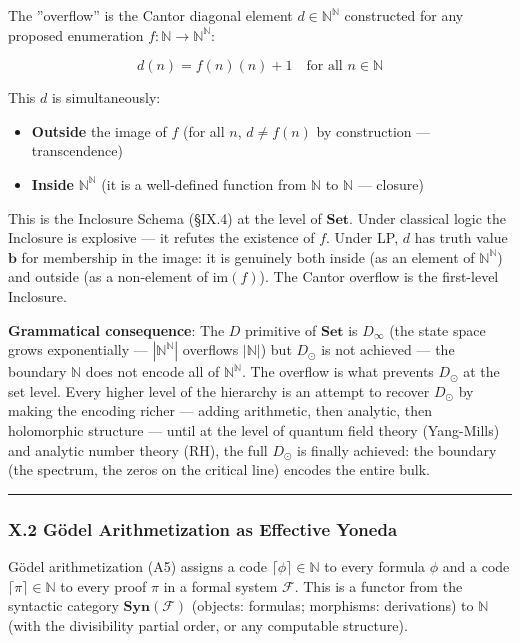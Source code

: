 \documentclass[12pt,a4paper]{article}
\newcommand{\pilcrow}{\S}
\begin{document}
The ''overflow'' is the Cantor diagonal element $d \in \mathbb{N}^{\mathbb{N}}$ constructed for any proposed enumeration $f: \mathbb{N} \to \mathbb{N}^{\mathbb{N}}$:

\[d(n) = f(n)(n) + 1 \quad \text{for all } n \in \mathbb{N}\]

This $d$ is simultaneously:

\begin{itemize}
    \item \textbf{Outside} the image of $f$ (for all $n$, $d \neq f(n)$ by construction --- transcendence)
    \item \textbf{Inside} $\mathbb{N}^{\mathbb{N}}$ (it is a well-defined function from $\mathbb{N}$ to $\mathbb{N}$ --- closure)
\end{itemize}

This is the Inclosure Schema (\pilcrow{}IX.4) at the level of $\mathbf{Set}$. Under classical logic the Inclosure is explosive --- it refutes the existence of $f$. Under LP, $d$ has truth value $\mathbf{b}$ for membership in the image: it is genuinely both inside (as an element of $\mathbb{N}^{\mathbb{N}}$) and outside (as a non-element of $\text{im}(f)$). The Cantor overflow is the first-level Inclosure.

\textbf{Grammatical consequence}: The $D$ primitive of $\mathbf{Set}$ is $D_{\infty}$ (the state space grows exponentially --- $|\mathbb{N}^{\mathbb{N}}|$ overflows $|\mathbb{N}|$) but $D_{\odot}$ is not achieved --- the boundary $\mathbb{N}$ does not encode all of $\mathbb{N}^{\mathbb{N}}$. The overflow is what prevents $D_{\odot}$ at the set level. Every higher level of the hierarchy is an attempt to recover $D_{\odot}$ by making the encoding richer --- adding arithmetic, then analytic, then holomorphic structure --- until at the level of quantum field theory (Yang-Mills) and analytic number theory (RH), the full $D_{\odot}$ is finally achieved: the boundary (the spectrum, the zeros on the critical line) encodes the entire bulk.

\begin{center}
\rule{0.5\textwidth}{0.4pt}
\end{center}

\subsubsection{X.2 G\"odel Arithmetization as Effective Yoneda}

G\"odel arithmetization (A5) assigns a code $\lceil \phi \rceil \in \mathbb{N}$ to every formula $\phi$ and a code $\lceil \pi \rceil \in \mathbb{N}$ to every proof $\pi$ in a formal system $\mathcal{F}$. This is a functor from the syntactic category $\mathbf{Syn}(\mathcal{F})$ (objects: formulas; morphisms: derivations) to $\mathbb{N}$ (with the divisibility partial order, or any computable structure).
\end{document}
